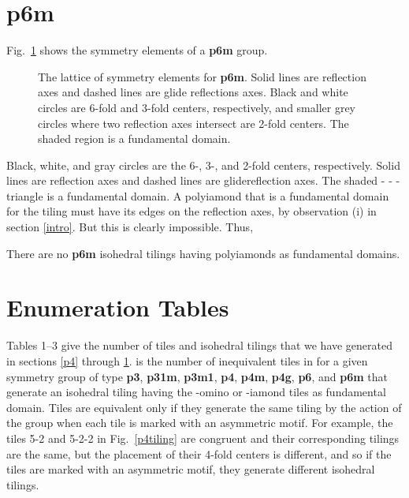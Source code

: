 \documentclass{ws-ijcga}
\begin{document}
\section{{\bf p6m}}
\label{p6m}
Fig.~\ref{fig:p6m} shows the symmetry elements of a {\bf p6m} group. 
\begin{figure}[h]
\centerline{
}
\vspace*{8pt}
\caption{
The lattice of symmetry elements for {\bf p6m}. 
Solid lines are reflection axes and dashed lines are glide reflections axes. 
Black and white circles are 6-fold and 3-fold centers, respectively, and smaller grey circles where
two reflection axes intersect are 2-fold centers. The shaded region is a fundamental domain.
\label{fig:p6m}
}
\end{figure}
Black, white, and gray circles are the 6-, 3-, and 2-fold centers, respectively. 
Solid lines are reflection axes and dashed lines are glidereflection axes. 
The shaded - - -triangle is a fundamental domain. 
A polyiamond that is a fundamental domain for the tiling must have its edges on the reflection axes, 
by observation (i) in section \ref{intro}. 
But this is clearly impossible. Thus,
\begin{theorem}
There are no {\bf p6m} isohedral tilings having polyiamonds as fundamental domains.
\end{theorem}









\section{Enumeration Tables}
\label{tables}
Tables 1--3 give 
the number of tiles and isohedral tilings that we have generated in sections \ref{p4}
through \ref{p6m}. 
 is the number of inequivalent tiles  in 
for a given symmetry group  of type 
{\bf p3}, {\bf p31m}, {\bf p3m1}, {\bf p4}, {\bf p4m}, {\bf p4g}, {\bf p6},
and {\bf p6m} that generate an isohedral tiling having
the -omino or -iamond tiles as fundamental domain. 
Tiles are equivalent only if they generate the same tiling by the action of the group  
when each tile is marked with an asymmetric motif. 
For example, the tiles 5-2 and 5-2-2 in Fig.~\ref{p4tiling} are congruent and their
corresponding tilings are the same, but the placement of their 4-fold centers is different, 
and so if the tiles are marked with an asymmetric motif, they generate different isohedral tilings.
\end{document}
